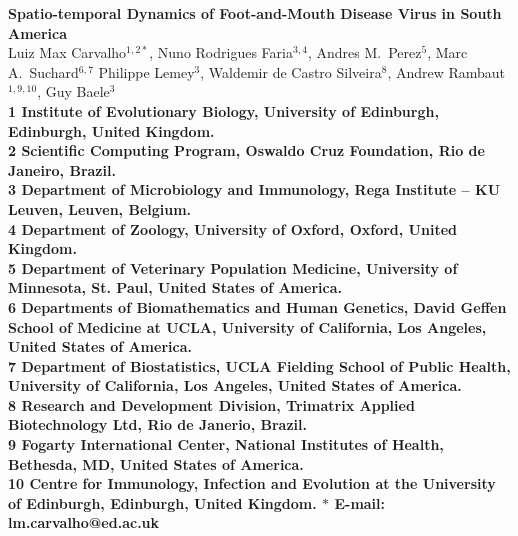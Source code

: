 \documentclass[10pt]{article}
\date{}
\begin{document}
\begin{flushleft}
{\Large
\textbf{Spatio-temporal Dynamics of Foot-and-Mouth Disease Virus in South America}
}
\\
Luiz Max Carvalho$^{1,2\ast}$,
Nuno Rodrigues Faria$^{3,4}$,
Andres M.~Perez$^{5}$,
Marc A.~Suchard$^{6,7}$
Philippe Lemey$^{3}$,
Waldemir de Castro Silveira$^{8}$,
Andrew Rambaut$^{1,9,10}$,
Guy Baele$^{3}$
\\
\bf{1} Institute of Evolutionary Biology, University of Edinburgh, Edinburgh, United Kingdom.\\
\bf{2} Scientific Computing Program, Oswaldo Cruz Foundation, Rio de Janeiro, Brazil.\\
\bf{3} Department of Microbiology and Immunology, Rega Institute -- KU Leuven, Leuven, Belgium.\\
\bf{4} Department of Zoology, University of Oxford, Oxford, United Kingdom.\\
\bf{5} Department of Veterinary Population Medicine, University of Minnesota, St. Paul, United States of America.\\
\bf{6} Departments of Biomathematics and Human Genetics, David Geffen School of Medicine at UCLA, University of California, Los Angeles,  United States of America.\\
\bf{7} Department of Biostatistics, UCLA Fielding School of Public Health, University of California, Los Angeles,  United States of America.\\
\bf{8} Research and Development Division, Trimatrix Applied Biotechnology Ltd, Rio de Janerio, Brazil.\\
\bf{9}  Fogarty International Center, National Institutes of Health, Bethesda, MD,  United States of America.\\
\bf{10} Centre for Immunology, Infection and Evolution at the University of Edinburgh, Edinburgh, United Kingdom.
$\ast$ E-mail: lm.carvalho@ed.ac.uk
\end{flushleft}
\end{document}
